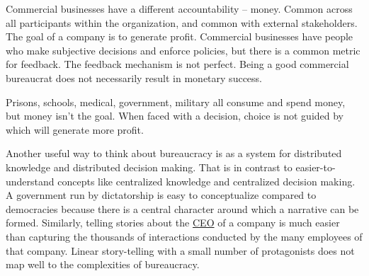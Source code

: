Commercial businesses have a different accountability -- money. Common across all participants within the organization, and common with external stakeholders. The goal of a company is to generate profit. Commercial businesses have people who make subjective decisions and enforce policies, but there is a common metric for feedback. The feedback mechanism is not perfect. Being a good commercial bureaucrat does not necessarily result in monetary success.

Prisons, schools, medical, government, military all consume and spend money, but money isn't the goal. When faced with a decision, choice is not guided by which will generate more profit. 




Another useful way to think about bureaucracy is as a system for distributed knowledge and distributed decision making. That is in contrast to easier-to-understand concepts like centralized knowledge and centralized decision making. A government run by dictatorship is easy to conceptualize compared to democracies because there is a central character around which a narrative can be formed. Similarly, telling stories about the \href{https://en.wikipedia.org/wiki/Chief_executive_officer}{CEO} of a company is much easier than capturing the thousands of interactions conducted by the many employees of that company. Linear story-telling with a small number of protagonists does not map well to the complexities of bureaucracy. 



